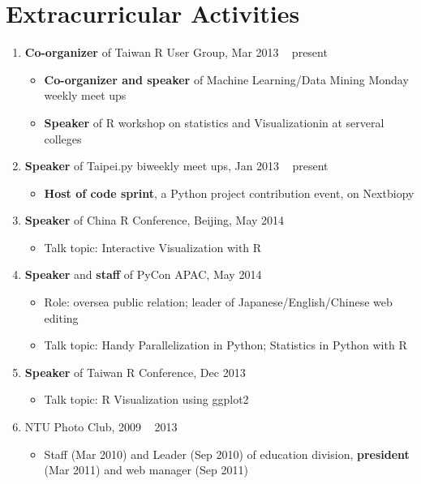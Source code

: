 \documentclass[11pt, a4paper]{scrartcl}
\begin{document}
\section*{Extracurricular Activities}
\begin{enumerate}

    \item \textbf{Co-organizer} of Taiwan R User Group, Mar 2013 \textendash~ present
    \begin{itemize}
        \item \textbf{Co-organizer and speaker} of Machine Learning/Data Mining Monday weekly meet ups
        \item \textbf{Speaker} of R workshop on statistics and Visualizationin at serveral colleges
    \end{itemize}

    \item \textbf{Speaker} of Taipei.py biweekly meet ups, Jan 2013 \textendash~ present
    \begin{itemize}
        \item \textbf{Host of code sprint}, a Python project contribution event, on Nextbiopy
    \end{itemize}

    \item \textbf{Speaker} of China R Conference, Beijing, May 2014
    \begin{itemize}
        \item Talk topic: Interactive Visualization with R
    \end{itemize}

    \item \textbf{Speaker} and \textbf{staff} of PyCon APAC, May 2014
    \begin{itemize}
        \item Role: oversea public relation; leader of Japanese/English/Chinese web editing
        \item Talk topic: Handy Parallelization in Python; Statistics in Python with R
    \end{itemize}

    \item \textbf{Speaker} of Taiwan R Conference, Dec 2013
    \begin{itemize}
        \item Talk topic: R Visualization using ggplot2
    \end{itemize}

    \item NTU Photo Club, 2009 \textendash~ 2013
    \begin{itemize}
        \item Staff (Mar 2010) and Leader (Sep 2010) of education division, \textbf{president} (Mar 2011) and web manager (Sep 2011)
    \end{itemize}


\end{enumerate}
\end{document}
